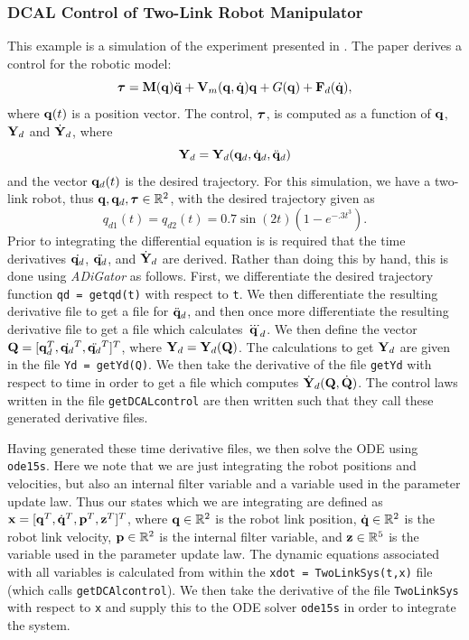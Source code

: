 \documentclass[10pt,pdftex]{article}
\begin{document}
\subsubsection{DCAL Control of Two-Link Robot Manipulator}
This example is a simulation of the experiment presented in \cite{Burg97}. The paper derives a control for the robotic model:
\begin{equation}
\boldsymbol{\tau} = \mathbf{M}(\mathbf{q})\ddot{\mathbf{q}} + \mathbf{V}_m(\mathbf{q},\dot{\mathbf{q}}) \mathbf{q} + G(\mathbf{q}) + \mathbf{F}_d(\dot{\mathbf{q}}),
\end{equation}
where $\mathbf{q}(t)$ is a position vector. The control, $\boldsymbol{\tau}$, is computed as a function of $\mathbf{q}$, $\mathbf{Y}_d$ and $\dot{\mathbf{Y}}_d$, where
\begin{equation}
\mathbf{Y}_d = \mathbf{Y}_d(\mathbf{q}_d,\dot{\mathbf{q}}_d,\ddot{\mathbf{q}}_d)
\end{equation}
and the vector $\mathbf{q}_d(t)$ is the desired trajectory. For this simulation, we have a two-link robot, thus $\mathbf{q},\mathbf{q}_d,\boldsymbol{\tau} \in \mathbb{R}^2$, with the desired trajectory given as
\begin{equation}
q_{d1}(t) = q_{d2}(t) = 0.7\sin(2t)\left(1-e^{-.3t^3}\right).
\end{equation}
Prior to integrating the differential equation is is required that the time derivatives $\dot{\mathbf{q}_d}$, $\ddot{\mathbf{q}_d}$, and $\dot{\mathbf{Y}}_d$ are derived. Rather than doing this by hand, this is done using \emph{ADiGator} as follows. First, we differentiate the desired trajectory function \texttt{qd = getqd(t)} with respect to \texttt{t}. We then differentiate the resulting derivative file to get a file for $\ddot{\mathbf{q}}_d$, and then once more differentiate the resulting derivative file to get a file which calculates $\dddot{\mathbf{q}}_d$. We then define the vector $\textbf{Q} = [\mathbf{q}_d^T, \dot{\mathbf{q}_d}^T, \ddot{\mathbf{q}_d}^T]^T$, where $\mathbf{Y}_d = \mathbf{Y}_d(\textbf{Q})$. The calculations to get $\mathbf{Y}_d$ are given in the file \texttt{Yd = getYd(Q)}. We then take the derivative of the file \texttt{getYd} with respect to time in order to get a file which computes $\dot{\mathbf{Y}}_d(\textbf{Q},\dot{\textbf{Q}})$. The control laws written in the file \texttt{getDCALcontrol} are then written such that they call these generated derivative files.

Having generated these time derivative files, we then solve the ODE using \texttt{ode15s}. Here we note that we are just integrating the robot positions and velocities, but also an internal filter variable and a variable used in the parameter update law. Thus our states which we are integrating are defined as $\mathbf{x} = [\mathbf{q}^T, \dot{\mathbf{q}}^T, \mathbf{p}^T, \mathbf{z}^T]^T$, where $\mathbf{q}\in\mathbb{R}^2$ is the robot link position, $\dot{\mathbf{q}}\in\mathbb{R}^2$ is the robot link velocity, $\mathbf{p}\in\mathbb{R}^2$ is the internal filter variable, and $\mathbf{z}\in\mathbb{R}^5$ is the variable used in the parameter update law. The dynamic equations associated with all variables is calculated from within the \texttt{xdot = TwoLinkSys(t,x)} file (which calls \texttt{getDCAlcontrol}). We then take the derivative of the file \texttt{TwoLinkSys} with respect to \texttt{x} and supply this to the ODE solver \texttt{ode15s} in order to integrate the system.
\end{document}
